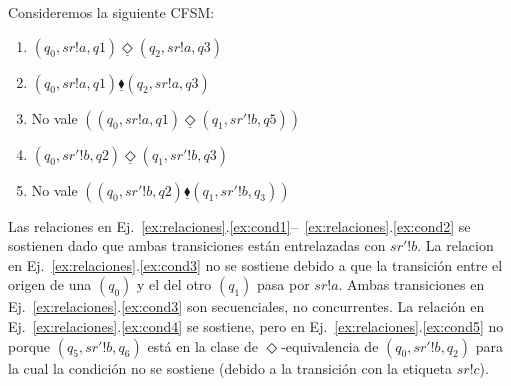 \begin{example}
\label{ex:relaciones}
Consideremos la siguiente CFSM:
\begin{center}
\end{center}

\begin{enumerate}
    \item \label{ex:cond1} $(q_0, sr!a,q1) \underline{\Diamond} (q_2,sr!a,q3)  $ %
    \item \label{ex:cond2} $(q_0, sr!a,q1) \underline{\blacklozenge} (q_2,sr!a,q3) $ %
    \item \label{ex:cond3} No vale $ ((q_0, sr!a,q1) \underline{\Diamond} (q_1,sr'!b,q5))$ %
    \item \label{ex:cond4} $ (q_0, sr'!b,q2) \underline{\Diamond} (q_1, sr'!b,q3)$ %
    \item \label{ex:cond5} No vale $((q_0, sr'!b,q2) \underline{\blacklozenge} (q_1,sr'!b,q_3)) $
\end{enumerate}

Las relaciones en Ej.~\ref{ex:relaciones}.\ref{ex:cond1}--~\ref{ex:relaciones}.\ref{ex:cond2} se sostienen dado que ambas transiciones están entrelazadas con $sr'!b$. La relacion en Ej.~\ref{ex:relaciones}.\ref{ex:cond3} no se sostiene debido a que la transición entre el origen de una $(q_0)$ y el del otro $(q_1)$ pasa por $sr!a$. Ambas transiciones en Ej.~\ref{ex:relaciones}.\ref{ex:cond3} son secuenciales, no concurrentes. La relación en Ej.~\ref{ex:relaciones}.\ref{ex:cond4} se sostiene, pero en Ej.~\ref{ex:relaciones}.\ref{ex:cond5} no porque $(q_5,sr'!b,q_6)$ está en la clase de $\Diamond$-equivalencia de $(q_0,sr'!b,q_2)$ para la cual la condición no se sostiene (debido a la transición con la etiqueta $sr!c$).
\end{example}

